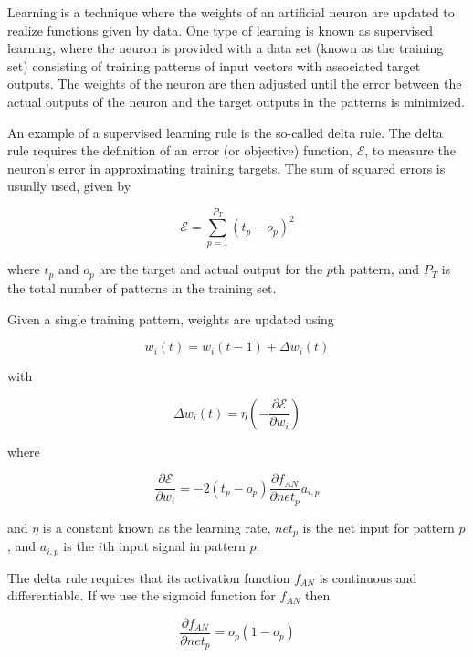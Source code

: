 \documentclass[master]{outhesis}
\begin{document}
Learning is a technique where the weights of an artificial neuron are updated to realize functions given by data.
One type of learning is known as supervised learning, where the neuron is provided with a data set (known as the training set) consisting of training patterns of input vectors with associated target outputs.
The weights of the neuron are then adjusted until the error between the actual outputs of the neuron and the target outputs in the patterns is minimized.

An example of a supervised learning rule is the so-called delta rule.
The delta rule requires the definition of an error (or objective) function, $\mathcal{E}$, to measure the neuron's error in approximating training targets.
The sum of squared errors is usually used, given by

\begin{equation}
\mathcal{E} = \sum_{p=1}^{P_T}(t_p-o_p)^2
\end{equation}

where $t_p$ and $o_p$ are the target and actual output for the $p$th pattern, and $P_T$ is the total number of patterns in the training set.

Given a single training pattern, weights are updated using

\begin{equation}
w_i(t) = w_i(t - 1) + \Delta w_i(t)
\end{equation}

with

\begin{equation}
\Delta w_i(t) = \eta(- \frac{\partial \mathcal{E}}{\partial w_i})
\end{equation}

where

\begin{equation}
\frac{\partial \mathcal{E}}{\partial w_i} = -2(t_p - o_p)\frac{\partial f_{AN}}{\partial net_p}a_{i,p}
\end{equation}

and $\eta$ is a constant known as the learning rate, $net_p$ is the net input for pattern $p$, and $a_{i,p}$ is the $i$th input signal in pattern $p$.

The delta rule requires that its activation function $f_{AN}$ is continuous and differentiable. If we use the sigmoid function for $f_{AN}$ then

\begin{equation}
\frac{\partial f_{AN}}{\partial net_p} = o_p(1 - o_p)
\end{equation}
\end{document}
